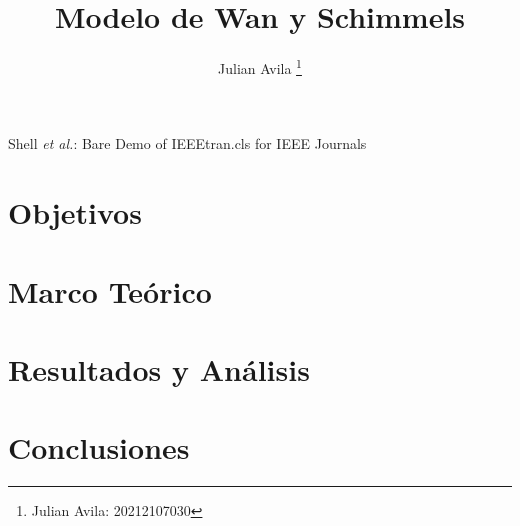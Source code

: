 \documentclass[journal, table]{IEEEtran}
\begin{document}
\title{Modelo de Wan y Schimmels}

\author[*]{Julian Avila
  \thanks{Julian Avila: 20212107030}}


\markboth{}
{Shell \MakeLowercase{\textit{et al.}}: Bare Demo of IEEEtran.cls for IEEE Journals}

\maketitle



\section{Objetivos}


\section{Marco Teórico}


\section{Resultados y Análisis}


\section{Conclusiones}


\printbibliography
\end{document}
